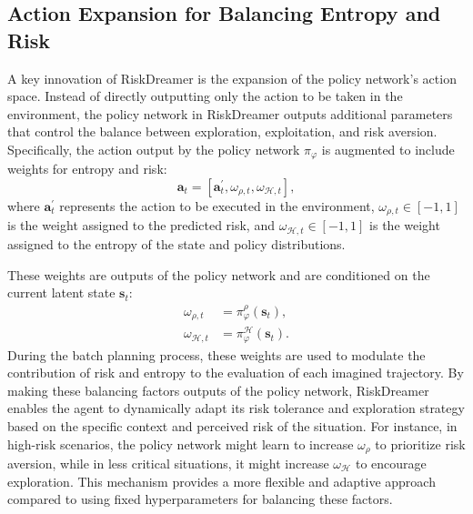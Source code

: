 \subsection{Action Expansion for Balancing Entropy and Risk}
A key innovation of RiskDreamer is the expansion of the policy network's action space. Instead of directly outputting only the action to be taken in the environment, the policy network in RiskDreamer outputs additional parameters that control the balance between exploration, exploitation, and risk aversion. Specifically, the action output by the policy network $\pi_{\varphi}$ is augmented to include weights for entropy and risk:
\begin{equation}
\mathbf{a}_t = [\mathbf{a}^{\prime}_{t}, \omega_{\rho, t}, \omega_{\mathcal{H}, t}],
\end{equation}
where $\mathbf{a}^{\prime}_{t}$ represents the action to be executed in the environment, $\omega_{\rho, t} \in [-1, 1]$ is the weight assigned to the predicted risk, and $\omega_{\mathcal{H}, t} \in [-1, 1]$ is the weight assigned to the entropy of the state and policy distributions.

These weights are outputs of the policy network and are conditioned on the current latent state $\mathbf{s}_t$:
\begin{equation}
    \begin{split}
        \omega_{\rho, t} &= \pi_{\varphi}^{\rho}(\mathbf{s}_t), \\
        \omega_{\mathcal{H}, t} &= \pi_{\varphi}^{\mathcal{H}}(\mathbf{s}_t).
    \end{split}
\end{equation}
During the batch planning process, these weights are used to modulate the contribution of risk and entropy to the evaluation of each imagined trajectory. By making these balancing factors outputs of the policy network, RiskDreamer enables the agent to dynamically adapt its risk tolerance and exploration strategy based on the specific context and perceived risk of the situation. For instance, in high-risk scenarios, the policy network might learn to increase $\omega_{\rho}$ to prioritize risk aversion, while in less critical situations, it might increase $\omega_{\mathcal{H}}$ to encourage exploration. This mechanism provides a more flexible and adaptive approach compared to using fixed hyperparameters for balancing these factors.





